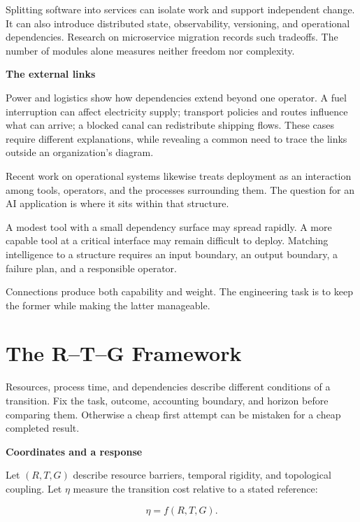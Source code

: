 \documentclass[11pt,openany]{book}
\newcommand{\subhead}[1]{\par\medskip\noindent\textbf{#1}\par\nobreak\smallskip}
\begin{document}
Splitting software into services can isolate work and support independent change. It can also introduce distributed state, observability, versioning, and operational dependencies. Research on microservice migration records such tradeoffs.\cite{taibi2018architectural} The number of modules alone measures neither freedom nor complexity.

\subhead{The external links}

Power and logistics show how dependencies extend beyond one operator. A fuel interruption can affect electricity supply; transport policies and routes influence what can arrive; a blocked canal can redistribute shipping flows.\cite{morison2004power,nzmfat2021,suez2021} These cases require different explanations, while revealing a common need to trace the links outside an organization's diagram.

Recent work on operational systems likewise treats deployment as an interaction among tools, operators, and the processes surrounding them.\cite{dong2022operational} The question for an AI application is where it sits within that structure.

A modest tool with a small dependency surface may spread rapidly. A more capable tool at a critical interface may remain difficult to deploy. Matching intelligence to a structure requires an input boundary, an output boundary, a failure plan, and a responsible operator.

Connections produce both capability and weight. The engineering task is to keep the former while making the latter manageable.

\section{The R--T--G Framework}

Resources, process time, and dependencies describe different conditions of a transition. Fix the task, outcome, accounting boundary, and horizon before comparing them. Otherwise a cheap first attempt can be mistaken for a cheap completed result.

\subhead{Coordinates and a response}

Let $(R,T,G)$ describe resource barriers, temporal rigidity, and topological coupling. Let $\eta$ measure the transition cost relative to a stated reference:

\begin{equation}
\eta=f(R,T,G).
\label{eq:eta-rtg}
\end{equation}
\end{document}
